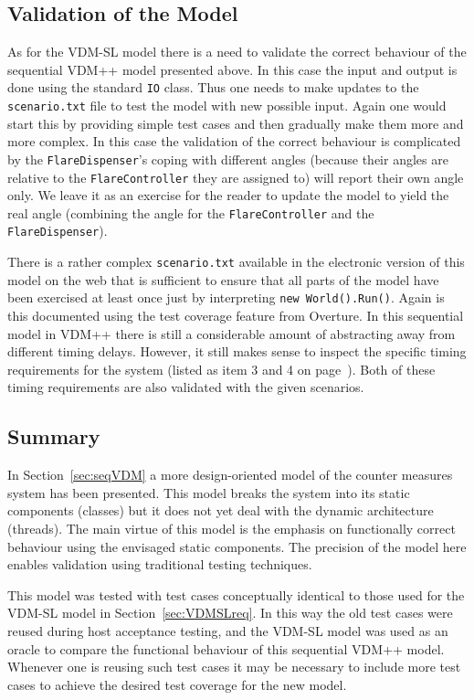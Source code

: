 \documentclass{overturerepchap}
\begin{document}
\subsection{Validation of the Model}

As for the VDM-SL model there is a need to validate the correct behaviour
of the sequential VDM++ model presented above. In this case the input
and output is done using the standard \texttt{IO} class. Thus one needs
to make updates to the \texttt{scenario.txt} file to test the model with
new possible input. Again one would start this by providing simple test
cases and then gradually make them more and more complex. In this case
the validation of the correct behaviour is complicated by the 
\texttt{FlareDispenser}'s coping with different angles (because their 
angles are relative to the \texttt{FlareController} they are assigned to)
will report their own angle only. We leave it as an exercise for the
reader to update the model to yield the real angle (combining the angle
for the \texttt{FlareController} and the \texttt{FlareDispenser}).

There is a rather complex \texttt{scenario.txt} available in the electronic
version of this model on the web that is sufficient to ensure that all parts of the
model have been exercised at least once just by interpreting
\texttt{new World().Run()}. Again is this documented using the
test coverage feature from Overture. In this sequential model in VDM++
there is still a considerable amount of
abstracting away from different timing delays. However, it still makes
sense to inspect the specific timing requirements for the system 
(listed as item 3 and 4 on page~\pageref{timereq34}). Both of these
timing requirements are also validated with the given scenarios.

\subsection{Summary}

In Section~\ref{sec:seqVDM} a more design-oriented model of the
counter measures system has been presented. This model breaks the
system into its static components (classes) but it does not yet deal
with the dynamic architecture (threads). The main virtue of this model
is the emphasis on functionally correct behaviour using the envisaged
static components.  The precision of the model here enables validation
using traditional testing techniques.

This model was tested with test cases conceptually identical to those
used for the VDM-SL model in Section~\ref{sec:VDMSLreq}.  In this way
the old test cases were reused during host acceptance testing, and the
VDM-SL model was used as an oracle to compare the functional behaviour
of this sequential VDM++ model. Whenever one is reusing such test
cases it may be necessary to include more test cases to achieve the
desired test coverage for the new model.
\end{document}
